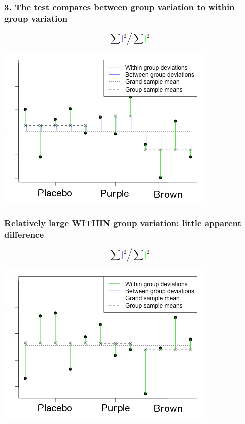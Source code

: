 \documentclass[11pt,containsverbatim,handout,xcolor=xelatex,dvipsnames,table]{beamer}
\begin{document}
\begin{frame}
\frametitle{3. The test compares between group variation to within group variation}

\[ \sum {\color{blue} \mid}^2 \Big/ \sum {\color{green} \mid}^2 \]

\begin{center}
\includegraphics[scale=0.6]{figures/anova-middle-ground-jelly-bean}
\end{center}

\end{frame}


\begin{frame}
\frametitle{Relatively large WITHIN group variation: little apparent difference}

\[ \sum {\color{blue} \mid}^2 \Big/ \sum {\color{green} \mid}^2 \]

\begin{center}
\includegraphics[scale=0.6]{figures/anova-lots-of-within-group-jelly-bean}
\end{center}

\end{frame}
\end{document}
